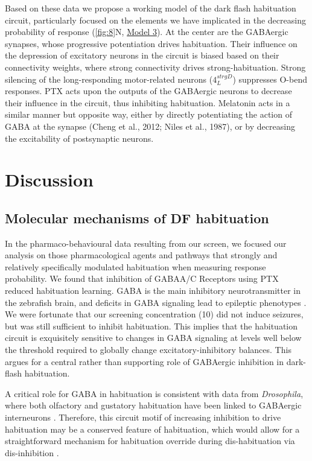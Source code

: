 \documentclass[9pt,lineno]{RandlettLab_elife}
\begin{document}
Based on these data we propose a working model of the dark flash habituation circuit, particularly focused on the elements we have implicated in the decreasing probability of response (\autoref{fig:8}N, \underline{Model 3}). At the center are the GABAergic synapses, whose progressive potentiation drives habituation. Their influence on the depression of excitatory neurons in the circuit is biased based on their connectivity weights, where strong connectivity drives strong-habituation. Strong silencing of the long-responding motor-related neurons ($4_{L}^{strgD}$) suppresses O-bend responses. PTX acts upon the outputs of the GABAergic neurons to decrease their influence in the circuit, thus inhibiting habituation. Melatonin acts in a similar manner but opposite way, either by directly potentiating the action of GABA at the synapse (Cheng et al., 2012; Niles et al., 1987), or by decreasing the excitability of postsynaptic neurons. 

\section{Discussion}
\subsection{Molecular mechanisms of DF habituation}

In the pharmaco-behavioural data resulting from our screen, we focused our analysis on those pharmacological agents and pathways that strongly and relatively specifically modulated habituation when measuring response probability. We found that inhibition of GABAA/C Receptors using PTX reduced habituation learning. GABA is the main inhibitory neurotransmitter in the zebrafish brain, and deficits in GABA signaling lead to epileptic phenotypes \cite{Baraban2005-xq}. We were fortunate that our screening concentration (10\muM) did not induce seizures, but was still sufficient to inhibit habituation. This implies that the habituation circuit is exquisitely sensitive to changes in GABA signaling at levels well below the threshold required to globally change excitatory-inhibitory balances. This argues for a central rather than supporting role of GABAergic inhibition in dark-flash habituation. 

A critical role for GABA in habituation is consistent with data from \emph{Drosophila}, where both olfactory and gustatory habituation have been linked to GABAergic interneurons \cite{Das2011-gd, Paranjpe2012-ce,Trisal2022-pa}. Therefore, this circuit motif of increasing inhibition to drive habituation may be a conserved feature of habituation, which would allow for a straightforward mechanism for habituation override during dis-habituation via dis-inhibition \cite{Cooke2020-mz, Trisal2022-pa}. 
\end{document}
